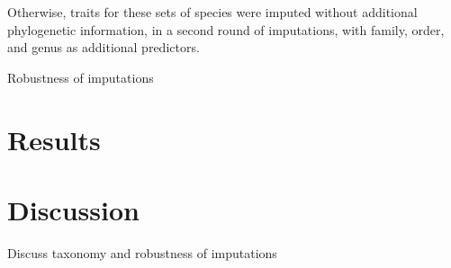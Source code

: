 Otherwise, traits for these sets of species were imputed without additional phylogenetic information, in a second round of imputations, with family, order, and genus as additional predictors.

Robustness of imputations

\section{Results}


\section{Discussion}
Discuss taxonomy and robustness of imputations

